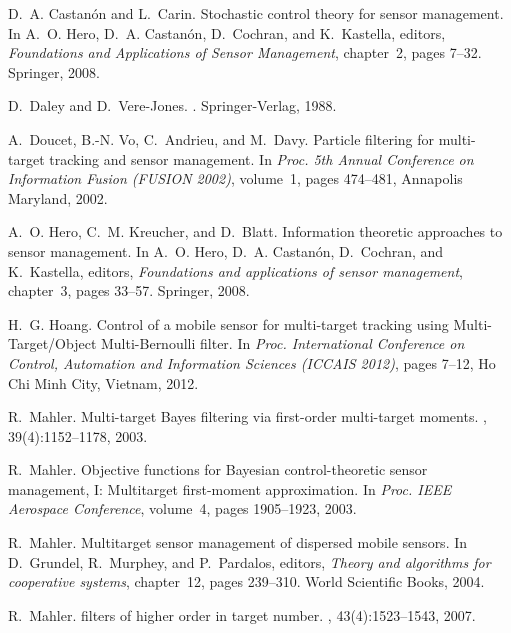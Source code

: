 \documentclass[twocolumn]{autart}
\begin{document}
\begin{thebibliography}{99}
D.~A. Castan\'on and L.~Carin.
\newblock Stochastic control theory for sensor management.
\newblock In A.~O. Hero, D.~A. Castan\'on, D.~Cochran, and K.~Kastella,
  editors, {\em Foundations and Applications of Sensor Management}, chapter~2,
  pages 7--32. Springer, 2008.

D.~Daley and D.~Vere-Jones.
.
\newblock Springer-Verlag, 1988.

A.~Doucet, B.-N. Vo, C.~Andrieu, and M.~Davy.
\newblock Particle filtering for multi-target tracking and sensor management.
\newblock In {\em Proc. 5th Annual Conference on Information Fusion (FUSION
  2002)}, volume~1, pages 474--481, Annapolis Maryland, 2002.

A.~O. Hero, C.~M. Kreucher, and D.~Blatt.
\newblock Information theoretic approaches to sensor management.
\newblock In A.~O. Hero, D.~A. Castan\'on, D.~Cochran, and K.~Kastella,
  editors, {\em Foundations and applications of sensor management}, chapter~3,
  pages 33--57. Springer, 2008.

H.~G. Hoang.
\newblock Control of a mobile sensor for multi-target tracking using
  {Multi-Target/Object Multi-Bernoulli} filter.
\newblock In {\em Proc. International Conference on Control, Automation and
  Information Sciences (ICCAIS 2012)}, pages 7--12, Ho Chi Minh City, Vietnam,
  2012.

R.~Mahler.
\newblock Multi-target {Bayes} filtering via first-order multi-target moments.
, 39(4):1152--1178, 2003.

R.~Mahler.
\newblock Objective functions for {Bayesian} control-theoretic sensor
  management, {I}: Multitarget first-moment approximation.
\newblock In {\em Proc. IEEE Aerospace Conference}, volume~4, pages 1905--1923,
  2003.

R.~Mahler.
\newblock Multitarget sensor management of dispersed mobile sensors.
\newblock In D.~Grundel, R.~Murphey, and P.~Pardalos, editors, {\em Theory and
  algorithms for cooperative systems}, chapter~12, pages 239--310. World
  Scientific Books, 2004.

R.~Mahler.
 filters of higher order in target number.
, 43(4):1523--1543, 2007.


\end{thebibliography}
\end{document}
